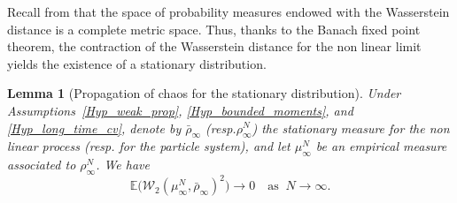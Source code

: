 \documentclass[11pt]{article}
\newcommand{\resp}{resp.\xspace}
\theoremstyle{plain}
\newtheorem{lemma}{Lemma}[section]
\theoremstyle{definition}
\begin{document}
Recall from \cite{bolley_separability} that the space of probability measures endowed with the Wasserstein distance is a complete metric space. Thus, thanks to the Banach fixed point theorem, the contraction of the Wasserstein distance for the non linear limit yields the existence of a stationary distribution.

\begin{lemma}[Propagation of chaos for the stationary distribution]
Under Assumptions~\ref{Hyp_weak_prop}, \ref{Hyp_bounded_moments}, and \ref{Hyp_long_time_cv}, denote by $\bar{\rho}_{\infty}$ (\resp $\rho^N_{\infty}$) the stationary measure for the non linear process (\resp for the particle system), and let $\mu^N_{\infty}$ be an empirical measure associated to $\rho^N_{\infty}$. We have
\[
\mathbb{E}\bigl(\mathcal{W}_2\left(\mu^N_{\infty},\bar{\rho}_{\infty}\right)^2\bigr)\to 0\quad\text{as }\ N\to\infty.
\]
\end{lemma}
\end{document}
